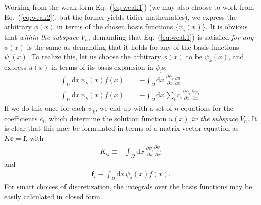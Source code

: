 \documentclass[a4paper, twocolumn]{article}
\newcommand{\eq} [1]{Eq.\ (\ref{eq:#1})}
\begin{document}
Working from the weak form \eq{weak1} (we may also choose to work from \eq{weak2}, but the former yields tidier mathematics), we express the arbitrary $\phi(x)$ in terms of the chosen basis functions $\{\psi_i(x)\}$. It is obvious that \textit{within the subspace }$V_n$, demanding that \eq{weak1} is satisfied \textit{for any} $\phi(x)$ is the same as demanding that it holds for any of the basis functions $\psi_i(x)$. To realize this, let us choose the arbitrary $\phi(x)$ to be $\psi_k(x)$, and express $u(x)$ in terms of its basis expansion in $\psi_i$s:
\begin{align}
\int_\Omega\mathrm{d}x\, \psi_k(x)f(x) &= -\int_\Omega \mathrm{d}x\, \frac{\partial \psi_k}{\partial x}\frac{\partial u}{\partial x} \nonumber \\
%
\int_\Omega\mathrm{d}x\, \psi_k(x)f(x) &= -\int_\Omega \mathrm{d}x\, \sum_i c_i \frac{\partial \psi_k}{\partial x}\frac{\partial \psi_i}{\partial x}. \nonumber 
\end{align}
If we do this once for each $\psi_k$, we end up with a set of $n$ equations for the coefficients $c_i$, which determine the solution function $u(x)$ \textit{in the subspace} $V_n$. It is clear that this may be formulated in terms of a matrix-vector equation as $K\mathbf{c}=\mathbf{f}$, with
\begin{align}
K_{ij}\equiv -\int_\Omega \mathrm{d}x\, \frac{\partial \psi_i}{\partial x}\frac{\partial \psi_j}{\partial x}
\end{align}
and
\begin{align}
\mathbf{f}_i \equiv  \int_\Omega\mathrm{d}x\, \psi_i(x)f(x).
\end{align}
For smart choices of discretization, the integrals over the basis functions may be easily calculated in closed form. 
\end{document}
